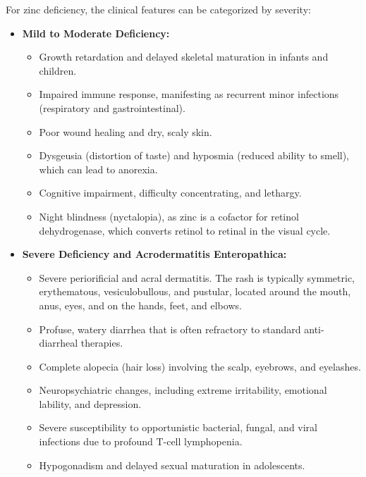 For zinc deficiency, the clinical features can be categorized by severity:
\begin{itemize}
    \item \textbf{Mild to Moderate Deficiency:}
    \begin{itemize}
        \item Growth retardation and delayed skeletal maturation in infants and children.
        \item Impaired immune response, manifesting as recurrent minor infections (respiratory and gastrointestinal).
        \item Poor wound healing and dry, scaly skin.
        \item Dysgeusia (distortion of taste) and hyposmia (reduced ability to smell), which can lead to anorexia.
        \item Cognitive impairment, difficulty concentrating, and lethargy.
        \item Night blindness (nyctalopia), as zinc is a cofactor for retinol dehydrogenase, which converts retinol to retinal in the visual cycle.
    \end{itemize}
    \item \textbf{Severe Deficiency and Acrodermatitis Enteropathica:}
    \begin{itemize}
        \item Severe periorificial and acral dermatitis. The rash is typically symmetric, erythematous, vesiculobullous, and pustular, located around the mouth, anus, eyes, and on the hands, feet, and elbows.
        \item Profuse, watery diarrhea that is often refractory to standard anti-diarrheal therapies.
        \item Complete alopecia (hair loss) involving the scalp, eyebrows, and eyelashes.
        \item Neuropsychiatric changes, including extreme irritability, emotional lability, and depression.
        \item Severe susceptibility to opportunistic bacterial, fungal, and viral infections due to profound T-cell lymphopenia.
        \item Hypogonadism and delayed sexual maturation in adolescents.
    \end{itemize}
\end{itemize}

